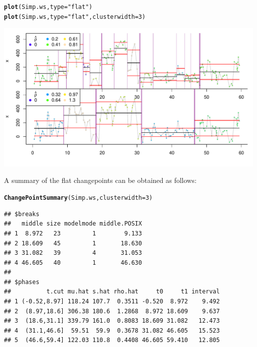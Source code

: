 \documentclass[10pt]{article}\usepackage[]{graphicx}\usepackage[]{color}
\makeatletter
\newcommand{\hlnum}[1]{\textcolor[rgb]{0.686,0.059,0.569}{#1}}%
\newcommand{\hlstr}[1]{\textcolor[rgb]{0.192,0.494,0.8}{#1}}%
\newcommand{\hlstd}[1]{\textcolor[rgb]{0.345,0.345,0.345}{#1}}%
\newcommand{\hlkwc}[1]{\textcolor[rgb]{0.333,0.667,0.333}{#1}}%
\newcommand{\hlkwd}[1]{\textcolor[rgb]{0.737,0.353,0.396}{\textbf{#1}}}%
\newenvironment{kframe}{%
 \def\at@end@of@kframe{}%
 \ifinner\ifhmode%
  \def\at@end@of@kframe{\end{minipage}}%
  \begin{minipage}{\columnwidth}%
 \fi\fi%
 \def\FrameCommand##1{\hskip\@totalleftmargin \hskip-\fboxsep
 \colorbox{shadecolor}{##1}\hskip-\fboxsep
     \hskip-\linewidth \hskip-\@totalleftmargin \hskip\columnwidth}%
 \MakeFramed {\advance\hsize-\width
   \@totalleftmargin\z@ \linewidth\hsize
   \@setminipage}}%
 {\par\unskip\endMakeFramed%
 \at@end@of@kframe}
\newenvironment{knitrout}{}{} %
\makeatother
\begin{document}
\begin{knitrout}\small
{}\color{fgcolor}\begin{kframe}
\begin{alltt}
\hlkwd{plot}\hlstd{(Simp.ws,} \hlkwc{type} \hlstd{=} \hlstr{"flat"}\hlstd{)}
\hlkwd{plot}\hlstd{(Simp.ws,} \hlkwc{type} \hlstd{=} \hlstr{"flat"}\hlstd{,} \hlkwc{clusterwidth} \hlstd{=} \hlnum{3}\hlstd{)}
\end{alltt}
\end{kframe}
\includegraphics[width=\textwidth]{figure/BCPAflat} 

\end{knitrout}


A summary of the flat changepoints can be obtained as follows: 
\begin{knitrout}
\color{fgcolor}\begin{kframe}
\begin{alltt}
\hlkwd{ChangePointSummary}\hlstd{(Simp.ws,} \hlkwc{clusterwidth} \hlstd{=} \hlnum{3}\hlstd{)}
\end{alltt}
\begin{verbatim}
## $breaks
##   middle size modelmode middle.POSIX
## 1  8.972   23         1        9.133
## 2 18.609   45         1       18.630
## 3 31.082   39         4       31.053
## 4 46.605   40         1       46.630
## 
## $phases
##          t.cut mu.hat s.hat rho.hat     t0     t1 interval
## 1 (-0.52,8.97] 118.24 107.7  0.3511 -0.520  8.972    9.492
## 2  (8.97,18.6] 306.38 180.6  1.2868  8.972 18.609    9.637
## 3  (18.6,31.1] 339.79 161.0  0.8083 18.609 31.082   12.473
## 4  (31.1,46.6]  59.51  59.9  0.3678 31.082 46.605   15.523
## 5  (46.6,59.4] 122.03 110.8  0.4408 46.605 59.410   12.805
\end{verbatim}
\end{kframe}
\end{knitrout}
\end{document}
